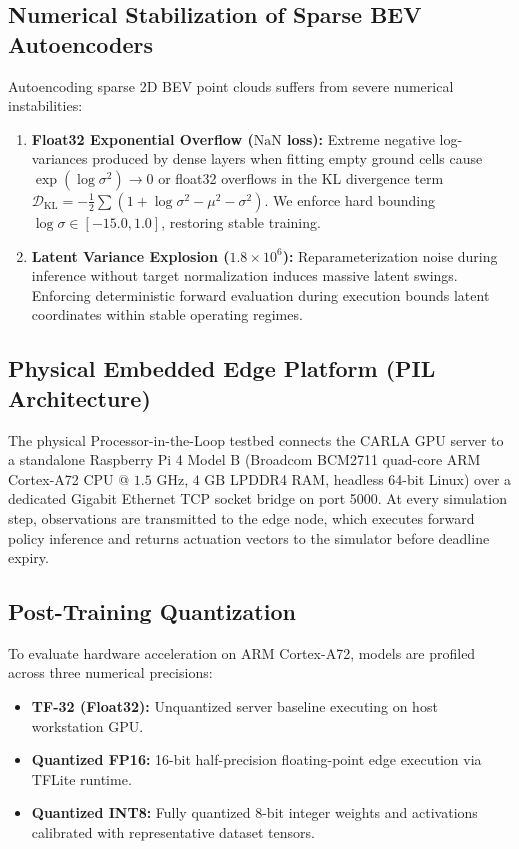 \documentclass[conference]{IEEEtran}
\begin{document}
\subsection{Numerical Stabilization of Sparse BEV Autoencoders}
Autoencoding sparse 2D BEV point clouds suffers from severe numerical instabilities:
\begin{enumerate}
    \item \textbf{Float32 Exponential Overflow ($\text{NaN}$ loss):} Extreme negative log-variances produced by dense layers when fitting empty ground cells cause $\exp(\log \sigma^2) \to 0$ or float32 overflows in the KL divergence term $\mathcal{D}_{\text{KL}} = -\frac{1}{2}\sum (1 + \log \sigma^2 - \mu^2 - \sigma^2)$. We enforce hard bounding $\log \sigma \in [-15.0, 1.0]$, restoring stable training.
    \item \textbf{Latent Variance Explosion ($1.8\times 10^6$):} Reparameterization noise during inference without target normalization induces massive latent swings. Enforcing deterministic forward evaluation during execution bounds latent coordinates within stable operating regimes.
\end{enumerate}

\subsection{Physical Embedded Edge Platform (PIL Architecture)}
The physical Processor-in-the-Loop testbed connects the CARLA GPU server to a standalone Raspberry Pi 4 Model B (Broadcom BCM2711 quad-core ARM Cortex-A72 CPU @ $1.5\text{ GHz}$, $4\text{ GB}$ LPDDR4 RAM, headless 64-bit Linux) over a dedicated Gigabit Ethernet TCP socket bridge on port 5000. At every simulation step, observations are transmitted to the edge node, which executes forward policy inference and returns actuation vectors to the simulator before deadline expiry.

\subsection{Post-Training Quantization}
To evaluate hardware acceleration on ARM Cortex-A72, models are profiled across three numerical precisions:
\begin{itemize}
    \item \textbf{TF-32 (Float32):} Unquantized server baseline executing on host workstation GPU.
    \item \textbf{Quantized FP16:} 16-bit half-precision floating-point edge execution via TFLite runtime.
    \item \textbf{Quantized INT8:} Fully quantized 8-bit integer weights and activations calibrated with representative dataset tensors.
\end{itemize}
\end{document}
